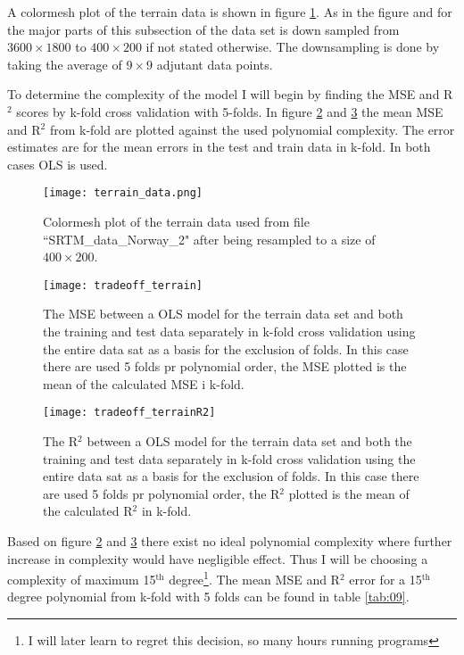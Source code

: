 \documentclass[uio,jmp,amsmath,amssymb,reprint,nofootinbib]{revtex4-1}
\numberwithin{equation}{section}
\begin{document}
A colormesh plot of the terrain data is shown in figure \ref{fig:terrain_data}. As in the figure and for the major parts of this subsection of the data set is down sampled from \(3600\times 1800\) to \(400\times 200\) if not stated otherwise. The downsampling is done by taking the average of \(9\times 9\) adjutant data points.

To determine the complexity of the model I will begin by finding the MSE and R\(^2\) scores by k-fold cross validation with 5-folds. In figure \ref{fig:test_vs_train2} and \ref{fig:test_vs_train3} the mean MSE and R\(^2\) from k-fold are plotted against the used polynomial complexity. The error estimates are for the mean errors in the test and train data in k-fold. In both cases OLS is used.

\begin{figure}[H]
    \centering
    \texttt{[image: terrain\_data.png]}
    \caption{Colormesh plot of the terrain data used from file ``SRTM\_data\_Norway\_2" after being resampled to a size of \(400\times 200\).}
    \label{fig:terrain_data}
\end{figure}

\begin{figure}[H]
    \centering
    \texttt{[image: tradeoff\_terrain]}
    \caption{The MSE between a OLS model for the terrain data set and both the training and test data separately in k-fold cross validation using the entire data sat as a basis for the exclusion of folds. In this case there are used 5 folds pr polynomial order, the MSE plotted is the mean of the calculated MSE i k-fold.}
    \label{fig:test_vs_train2}
\end{figure}

\begin{figure}[H]
    \centering
    \texttt{[image: tradeoff\_terrainR2]}
    \caption{The R\(^2\) between a OLS model for the terrain data set and both the training and test data separately in k-fold cross validation using the entire data sat as a basis for the exclusion of folds. In this case there are used 5 folds pr polynomial order, the R\(^2\) plotted is the mean of the calculated R\(^2\) in k-fold.}
    \label{fig:test_vs_train3}
\end{figure}

Based on figure \ref{fig:test_vs_train2} and \ref{fig:test_vs_train3} there exist no ideal polynomial complexity where further increase in complexity would have negligible effect. Thus I will be choosing a complexity of maximum 15\(^\text{th}\) degree\footnote{I will later learn to regret this decision, so many hours running programs}. The mean MSE and R\(^2\) error for a 15\(^\text{th}\) degree polynomial from k-fold with 5 folds can be found in table \ref{tab:09}.
\end{document}

